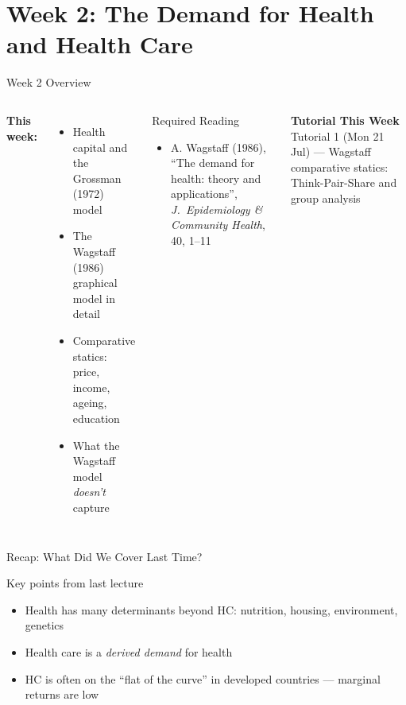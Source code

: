 \documentclass[aspectratio=169, 12pt]{beamer}
\newcommand{\recapslide}[1]{%
  \begin{frame}{Recap: What Did We Cover Last Time?}
    \begin{block}{Key points from last lecture}
      \begin{itemize}#1\end{itemize}
    \end{block}
  \end{frame}}
\newcommand{\tutorialbox}[1]{%
  \begin{block}{\textbf{Tutorial This Week}}
    #1
  \end{block}}
\begin{document}

\section{Week 2: The Demand for Health and Health Care}

\begin{frame}{Week 2 Overview}
  \begin{columns}
      \textbf{This week:}
      \begin{itemize}
        \item Health capital and the Grossman (1972) model
        \item The Wagstaff (1986) graphical model in detail
        \item Comparative statics: price, income, ageing, education
        \item What the Wagstaff model \emph{doesn't} capture
      \end{itemize}
      \begin{block}{Required Reading}
        {\small
        \begin{itemize}
          \item A. Wagstaff (1986), ``The demand for health: theory and applications'',
                \textit{J.\ Epidemiology \& Community Health}, 40, 1--11
        \end{itemize}}
      \end{block}
      \vspace{0.3em}
      \tutorialbox{Tutorial 1 (Mon 21 Jul) --- Wagstaff comparative statics: Think-Pair-Share and group analysis}
  \end{columns}
\end{frame}


\recapslide{
  \item Health has many determinants beyond HC: nutrition, housing, environment, genetics
  \item Health care is a \emph{derived demand} for health
  \item HC is often on the ``flat of the curve'' in developed countries --- marginal returns are low
}
\end{document}
